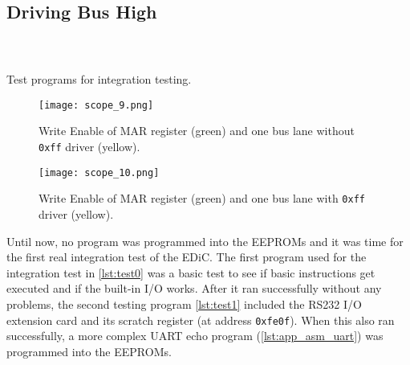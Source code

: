 \subsection{Driving Bus High}\label{sec:eval_bus}
\begin{listing}[t]
  \centering
  \begin{sublisting}[b]{.45\textwidth}
    \inputminted[linenos,
      breaklines,
      frame=leftline,
      xleftmargin=20pt,
    ]{ARM}{src/test0.s}
    \label{lst:test0}
  \end{sublisting}

  \begin{sublisting}[b]{.45\textwidth}
    \inputminted[linenos,
      breaklines,
      frame=leftline,
      xleftmargin=20pt,
    ]{ARM}{src/test1.s}
    \label{lst:test1}
  \end{sublisting}%
  \hspace{.05\textwidth}
  \begin{sublisting}[b]{.45\textwidth}
    \inputminted[linenos,
      breaklines,
      frame=leftline,
      xleftmargin=20pt,
    ]{ARM}{src/test2.s}
    \label{lst:test2}
  \end{sublisting}
  \caption{Test programs for integration testing.}
\end{listing}
\begin{figure}[t]
  \texttt{[image: scope\_9.png]}
  \caption{Write Enable of \gls{MAR} register (green) and one bus lane without \texttt{0xff} driver (yellow).}
  \label{fig:busPullup}
\end{figure}
\begin{figure}[t]
  \texttt{[image: scope\_10.png]}
  \caption{Write Enable of \gls{MAR} register (green) and one bus lane with \texttt{0xff} driver (yellow).}
  \label{fig:busPullupFix}
\end{figure}
Until now, no program was programmed into the \glspl{EEPROM} and it was time for the first real integration test of the \gls{EDiC}.
The first program used for the integration test in \cref{lst:test0} was a basic test to see if basic instructions get executed and if the built-in I/O works.
After it ran successfully without any problems, the second testing program \cref{lst:test1} included the RS232 I/O extension card and its scratch register (at address \texttt{0xfe0f}).
When this also ran successfully, a more complex \gls{UART} echo program (\cref{lst:app_asm_uart}) was programmed into the \glspl{EEPROM}.
